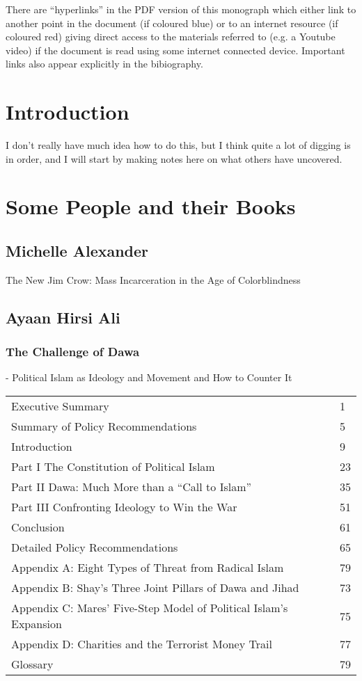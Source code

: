 \documentclass[10pt,titlepage]{book}
\begin{document}

There are ``hyperlinks'' in the PDF version of this monograph which either link to another point in the document  (if coloured blue) or to an internet resource  (if coloured red) giving direct access to the materials referred to (e.g. a Youtube video) if the document is read using some internet connected device.
Important links also appear explicitly in the bibiography.

\chapter{Introduction}


I don't really have much idea how to do this, but I think quite a lot of digging is in order, and I will start by making notes here on what others have uncovered.

\chapter{Some People and their Books}

\section{Michelle Alexander}

The New Jim Crow: Mass Incarceration
in the Age of Colorblindness \cite{alexander-tnjc}

\section{Ayaan Hirsi Ali}

\subsection{The Challenge of Dawa}
- 
Political Islam as
Ideology and Movement
and How to Counter It \cite{ali-dawa}

\begin{small}
\begin{tabular}{l l}
Executive Summary & 1\\
Summary of Policy Recommendations&5\\
Introduction&9\\
Part I The Constitution of Political Islam&23\\
Part II Dawa: Much More than a “Call to Islam”&35\\
Part III Confronting Ideology to Win the War&51\\
Conclusion&61\\
Detailed Policy Recommendations&65\\
Appendix A: Eight Types of Threat from Radical Islam&79\\
Appendix B: Shay’s Three Joint Pillars of Dawa and Jihad&73\\
Appendix C: Mares’ Five-Step Model of Political Islam’s
Expansion&75\\
Appendix D: Charities and the Terrorist Money Trail&77\\
Glossary&79\\
\end{tabular}
\end{small}
\end{document}
